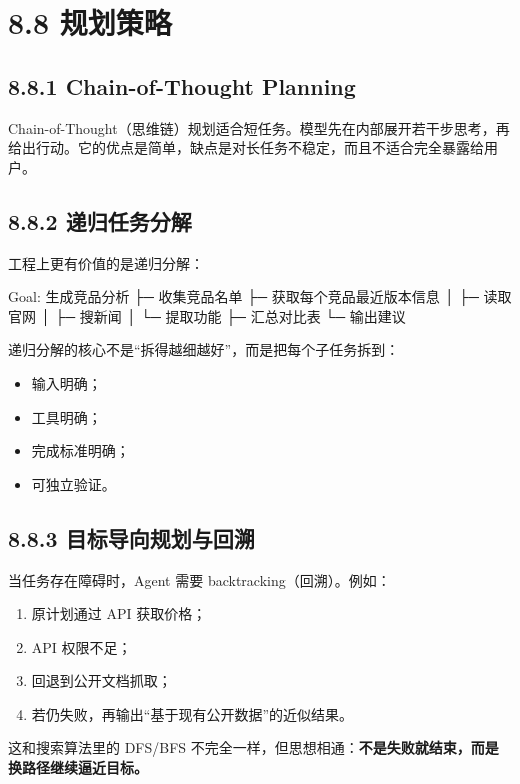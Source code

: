 \section{8.8 规划策略}

\subsection{8.8.1 Chain-of-Thought Planning}

Chain-of-Thought（思维链）规划适合短任务。模型先在内部展开若干步思考，再给出行动。它的优点是简单，缺点是对长任务不稳定，而且不适合完全暴露给用户。


\subsection{8.8.2 递归任务分解}

工程上更有价值的是递归分解：


\begin{codeblock}
Goal: 生成竞品分析
 ├─ 收集竞品名单
 ├─ 获取每个竞品最近版本信息
 │   ├─ 读取官网
 │   ├─ 搜新闻
 │   └─ 提取功能
 ├─ 汇总对比表
 └─ 输出建议
\end{codeblock}

递归分解的核心不是``拆得越细越好''，而是把每个子任务拆到：


\begin{itemize}[leftmargin=2em]
\item 输入明确；
\item 工具明确；
\item 完成标准明确；
\item 可独立验证。
\end{itemize}

\subsection{8.8.3 目标导向规划与回溯}

当任务存在障碍时，Agent 需要 backtracking（回溯）。例如：


\begin{enumerate}[leftmargin=2em]
\item 原计划通过 API 获取价格；
\item API 权限不足；
\item 回退到公开文档抓取；
\item 若仍失败，再输出``基于现有公开数据''的近似结果。
\end{enumerate}

这和搜索算法里的 DFS/BFS 不完全一样，但思想相通：\textbf{不是失败就结束，而是换路径继续逼近目标。}


